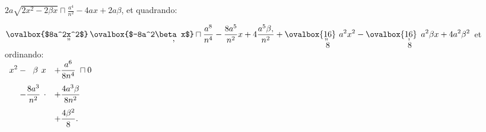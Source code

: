                      $\displaystyle 2a\sqrt{2x^2 - 2\beta x}\sqcap \displaystyle\frac{a^4}{n^2} - 4ax + 2a\beta$, et quadrando: \rule[0cm]{0pt}{20pt}%
                     $\displaystyle \ovalbox{$8a^2x^2$} \hspace{-26pt}\raisebox{-3pt}{,,} \hspace{23pt}\ovalbox{$-8a^2\beta x$} \hspace{-26pt}\raisebox{-5pt}{,} \hspace{23pt}\sqcap \frac{a^8}{n^4}-\frac{8a^5}{n^2}x+4\frac{a^5\beta,}{n^2}+\ovalbox{16} \hspace{-14pt}\raisebox{-3pt}{,,} \hspace{11pt}\hspace{-14pt}\raisebox{-13pt}{8} \hspace{11pt}a^2x^2-\ovalbox{16} \hspace{-11pt}\raisebox{-3pt}{,} \hspace{11pt}\hspace{-14pt}\raisebox{-13pt}{8} \hspace{11pt}a^2\beta x +4a^2\beta^2$ et ordinando: \\
                     $\begin{array}{rll}
                   \displaystyle  x^2-\hspace{6pt}\beta \hspace{4pt}x&+ \displaystyle\frac{a^6}{8n^4}\hspace{3pt}\sqcap 0\rule[-0.5cm]{0cm}{1cm}\\
                  \displaystyle   -\frac{8a^3}{n^2}\hspace{4pt}\raisebox{2pt}{.}&\displaystyle+\frac{4a^3 \beta}{8n^2}\rule[-0.5cm]{0cm}{1cm}\\
                   \displaystyle   &\displaystyle+ \frac{4\beta ^2}{8}.&
                     \end{array}$\\
